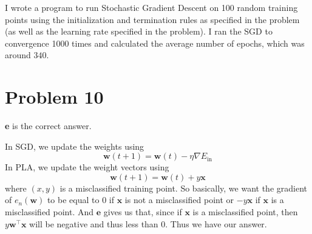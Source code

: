 \documentclass{article}
\begin{document}
\noindent I wrote a program to run Stochastic Gradient Descent on 100 random
training points using the initialization and termination rules as specified
in the problem (as well as the learning rate specified in the problem).
I ran the SGD to convergence 1000 times and calculated the average number of
epochs, which was around $340$.

\section*{Problem 10}
\textbf{e} is the correct answer.

\noindent In SGD, we update the weights using
\[ \mathbf{w}(t+1) = \mathbf{w}(t) - \eta \nabla E_{\text{in}} \]
In PLA, we update the weight vectors using
\[ \mathbf{w}(t+1) = \mathbf{w}(t) + y\mathbf{x} \]
where $(x,y)$ is a misclassified training point.
So basically, we want the gradient of $e_n(\mathbf{w})$ to be equal to
$0$ if $\mathbf{x}$ is not a misclassified point or $-y\mathbf{x}$ if $\mathbf{x}$
is a misclassified point. And $\textbf{e}$ gives us that, since if $\mathbf{x}$
is a misclassified point, then $y\mathbf{w}^{\intercal}\mathbf{x}$ will be negative
and thus less than 0. Thus we have our answer.
\end{document}
